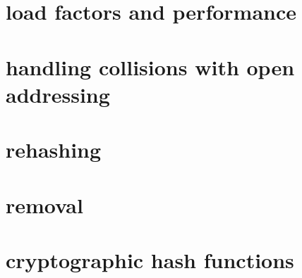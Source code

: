 

\section{load factors and performance}



\section{handling collisions with open addressing}












\section{rehashing}



\section{removal}



\section{cryptographic hash functions}



